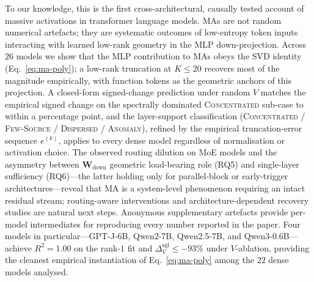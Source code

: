 \documentclass{article}
\newcommand{\Wdown}{\mathbf{W}_{\text{down}}}
\begin{document}
To our knowledge, this is the first cross-architectural, causally tested
account of massive activations in transformer language models. MAs are
not random numerical artefacts; they are systematic outcomes of
low-entropy token inputs interacting with learned low-rank geometry in
the MLP down-projection. Across $26$ models we show that the MLP
contribution to MAs obeys the SVD identity (Eq.~\eqref{eq:ma-poly}); a
low-rank truncation at $K \leq 20$ recovers most of the magnitude
empirically, with function tokens as the geometric anchors of this
projection. A
closed-form signed-change prediction under random $V$ matches the
empirical signed change on the spectrally dominated \textsc{Concentrated}
sub-case to within a percentage point, and the layer-support classification
(\textsc{Concentrated} / \textsc{Few-Source} / \textsc{Dispersed} /
\textsc{Anomaly}), refined by the empirical truncation-error sequence
$e^{(k)}$, applies to every dense model regardless of normalisation or
activation choice. The observed routing dilution on MoE models and the
asymmetry between $\Wdown$ geometric load-bearing role (RQ5) and single-layer
sufficiency (RQ6)---the latter holding only for parallel-block or
early-trigger architectures---reveal that MA is a system-level
phenomenon requiring an intact residual stream; routing-aware
interventions and architecture-dependent recovery studies are natural
next steps. Anonymous supplementary artefacts provide per-model
intermediates for reproducing every number reported in the paper. Four
models in particular---GPT-J-6B,
Qwen2-7B, Qwen2.5-7B, and Qwen3-0.6B---achieve $R^2 = 1.00$ on the rank-$1$
fit and $\Delta_V^{\text{sgl}} \leq -93\%$ under $V$-ablation, providing
the cleanest empirical instantiation of Eq.~\eqref{eq:ma-poly} among the
$22$ dense models analysed.




\appendix


\newpage

\end{document}
